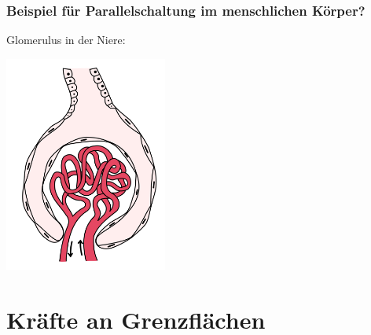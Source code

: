 \documentclass{beamer}
\begin{document}
\begin{frame}
\frametitle{Beispiel für Parallelschaltung im menschlichen Körper?}

\pause

Glomerulus in der Niere:

\begin{center}
\includegraphics[width=0.4\textwidth]{nierenkoerperchen.png}
\end{center}


\end{frame}





\section{Kräfte an Grenzflächen}



\end{document}

